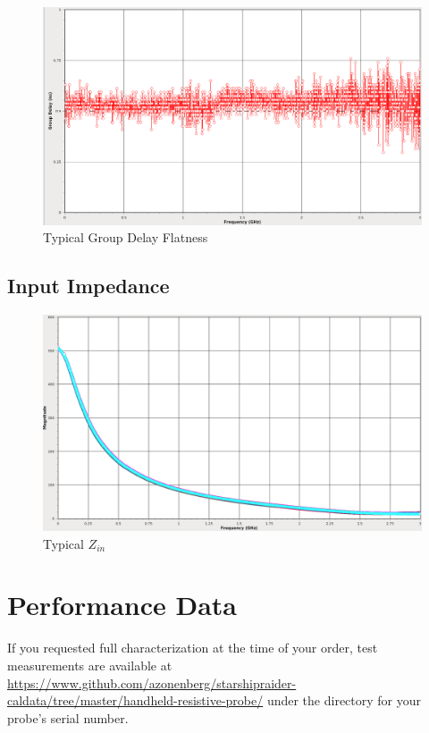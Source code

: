 \documentclass[11pt]{article}
\begin{document}
\begin{figure}[h]
\centering
\includegraphics[width=14cm]{typical-groupdelay.png}
\caption{Typical Group Delay Flatness}
\label{typical-groupdelay}
\end{figure}
\FloatBarrier

\subsection{Input Impedance}

\begin{figure}[h!]
\centering
\includegraphics[width=14cm]{typical-zin.png}
\caption{Typical $Z_{in}$}
\label{typical-zin}
\end{figure}

\FloatBarrier

\pagebreak
\section{Performance Data}

If you requested full characterization at the time of your order, test measurements are available at
\url{https://www.github.com/azonenberg/starshipraider-caldata/tree/master/handheld-resistive-probe/} under the
directory for your probe's serial number.
\end{document}
